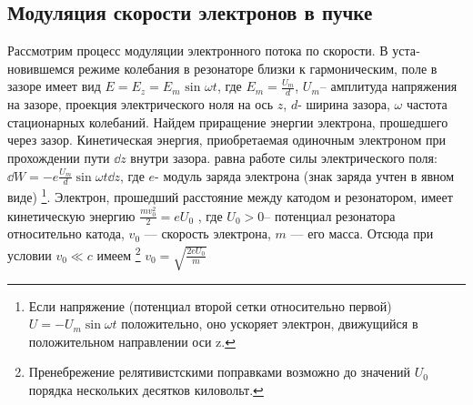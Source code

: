 \subsection{Модуляция скорости электронов в пучке}
Рассмотрим процесс модуляции электронного потока по скорости. В уста­новившемся режиме колебания в резонаторе близки к гармоническим, поле
в зазоре имеет вид 
$E = E _ { z } = E _ { m } \text { sin } \omega t$, 
где $E _ { m } = \frac { U _ { m } } { d }$, $U _ { m }$-- амплитуда напряжения на зазоре, проекция электрического ноля на ось $z$,
$d$- ширина зазора, $\omega$ частота стационарных колебаний. Найдем приращение энергии электрона, прошедшего через зазор. Кинетическая энергия,
приобретаемая одиночным электроном при прохождении пути $\dd z$ внутри за­зора. равна работе силы электрического поля: 
$\dd W = - e \frac { U _ { m } } { d } \sin \omega t \dd z$, где
$e$- модуль заряда электрона (знак заряда учтен в явном виде)
\footnote{Если напряжение (потенциал второй сетки относительно первой) $U = -U_m \sin \omega t$ положительно, оно ускоряет электрон, движущийся в положительном направлении оси z.}. Электрон,
прошедший расстояние между катодом и резонатором, имеет кинетическую
энергию 
$\frac { m v _ { 0 } ^ { 2 } } { 2 } = e U _ { 0 }$ , где $U_0 > 0$-- потенциал резонатора относительно ка­тода, $v_0$ — скорость электрона, $m$ — его масса. Отсюда при условии $v _ { 0 } \ll c$
имеем
\footnote{Пренебрежение релятивистскими поправками возможно до значений $U_0$ порядка нескольких
десятков киловольт.} 
$v _ { 0 } = \sqrt { \frac { 2 e U _ { 0 } } { m } }$

